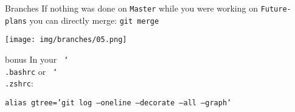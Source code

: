 \documentclass[usenames,dvipsnames,handout,9pt]{beamer}
\begin{document}
\begin{frame}{Branches}
If nothing was done on \texttt{Master} while you were working on \texttt{Future-plans} you can directly merge: \lstinline|git merge|

\texttt{[image: img/branches/05.png]}
\end{frame}

























\begin{frame}[fragile]{bonus}
  In your \texttt{~\char`\\.bashrc} or \texttt{~\char`\\.zshrc}:

  \texttt{alias gtree='git log --oneline --decorate --all --graph'}
\end{frame}



\end{document}
